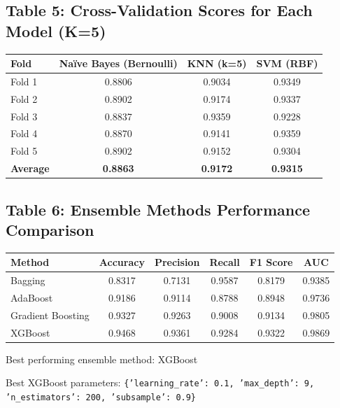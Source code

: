 \documentclass[12pt]{article}
\begin{document}
\subsection*{Table 5: Cross-Validation Scores for Each Model (K=5)}
\begin{center}
\begin{tabular}{lccc}
\toprule
\textbf{Fold} & \textbf{Naïve Bayes (Bernoulli)} & \textbf{KNN (k=5)} & \textbf{SVM (RBF)} \\
\midrule
Fold 1 & 0.8806 & 0.9034 & 0.9349 \\
Fold 2 & 0.8902 & 0.9174 & 0.9337 \\
Fold 3 & 0.8837 & 0.9359 & 0.9228 \\
Fold 4 & 0.8870 & 0.9141 & 0.9359 \\
Fold 5 & 0.8902 & 0.9152 & 0.9304 \\
\textbf{Average} & \textbf{0.8863} & \textbf{0.9172} & \textbf{0.9315} \\
\bottomrule
\end{tabular}
\end{center}

\subsection*{Table 6: Ensemble Methods Performance Comparison}
\begin{center}
\begin{tabular}{lccccc}
\toprule
\textbf{Method} & \textbf{Accuracy} & \textbf{Precision} & \textbf{Recall} & \textbf{F1 Score} & \textbf{AUC} \\
\midrule
Bagging & 0.8317 & 0.7131 & 0.9587 & 0.8179 & 0.9385 \\
AdaBoost & 0.9186 & 0.9114 & 0.8788 & 0.8948 & 0.9736 \\
Gradient Boosting & 0.9327 & 0.9263 & 0.9008 & 0.9134 & 0.9805 \\
XGBoost & 0.9468 & 0.9361 & 0.9284 & 0.9322 & 0.9869 \\
\bottomrule
\end{tabular}
\end{center}



Best performing ensemble method: XGBoost

Best XGBoost parameters: \texttt{\{'learning\_rate': 0.1, 'max\_depth': 9, 'n\_estimators': 200, 'subsample': 0.9\}}
\end{document}
